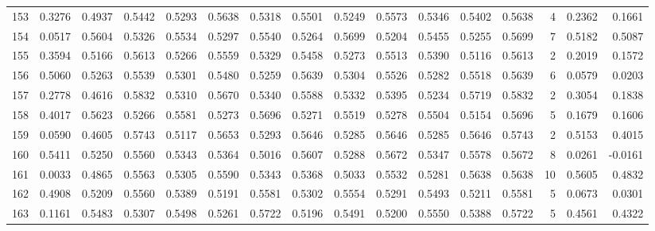 \begin{tabular}{lrrrrrrrrrrrrrrr}
153 &      0.3276 &  0.4937 &  0.5442 &  0.5293 &  0.5638 &  0.5318 &  0.5501 &  0.5249 &  0.5573 &  0.5346 &   0.5402 &     0.5638 &      4 &                    0.2362 &                     0.1661 \\
154 &      0.0517 &  0.5604 &  0.5326 &  0.5534 &  0.5297 &  0.5540 &  0.5264 &  0.5699 &  0.5204 &  0.5455 &   0.5255 &     0.5699 &      7 &                    0.5182 &                     0.5087 \\
155 &      0.3594 &  0.5166 &  0.5613 &  0.5266 &  0.5559 &  0.5329 &  0.5458 &  0.5273 &  0.5513 &  0.5390 &   0.5116 &     0.5613 &      2 &                    0.2019 &                     0.1572 \\
156 &      0.5060 &  0.5263 &  0.5539 &  0.5301 &  0.5480 &  0.5259 &  0.5639 &  0.5304 &  0.5526 &  0.5282 &   0.5518 &     0.5639 &      6 &                    0.0579 &                     0.0203 \\
157 &      0.2778 &  0.4616 &  0.5832 &  0.5310 &  0.5670 &  0.5340 &  0.5588 &  0.5332 &  0.5395 &  0.5234 &   0.5719 &     0.5832 &      2 &                    0.3054 &                     0.1838 \\
158 &      0.4017 &  0.5623 &  0.5266 &  0.5581 &  0.5273 &  0.5696 &  0.5271 &  0.5519 &  0.5278 &  0.5504 &   0.5154 &     0.5696 &      5 &                    0.1679 &                     0.1606 \\
159 &      0.0590 &  0.4605 &  0.5743 &  0.5117 &  0.5653 &  0.5293 &  0.5646 &  0.5285 &  0.5646 &  0.5285 &   0.5646 &     0.5743 &      2 &                    0.5153 &                     0.4015 \\
160 &      0.5411 &  0.5250 &  0.5560 &  0.5343 &  0.5364 &  0.5016 &  0.5607 &  0.5288 &  0.5672 &  0.5347 &   0.5578 &     0.5672 &      8 &                    0.0261 &                    -0.0161 \\
161 &      0.0033 &  0.4865 &  0.5563 &  0.5305 &  0.5590 &  0.5343 &  0.5368 &  0.5033 &  0.5532 &  0.5281 &   0.5638 &     0.5638 &     10 &                    0.5605 &                     0.4832 \\
162 &      0.4908 &  0.5209 &  0.5560 &  0.5389 &  0.5191 &  0.5581 &  0.5302 &  0.5554 &  0.5291 &  0.5493 &   0.5211 &     0.5581 &      5 &                    0.0673 &                     0.0301 \\
163 &      0.1161 &  0.5483 &  0.5307 &  0.5498 &  0.5261 &  0.5722 &  0.5196 &  0.5491 &  0.5200 &  0.5550 &   0.5388 &     0.5722 &      5 &                    0.4561 &                     0.4322 \\

\end{tabular}
